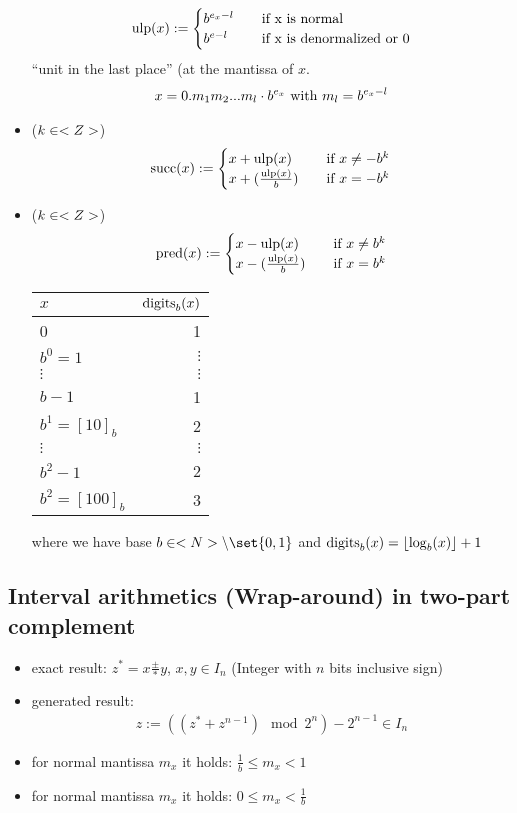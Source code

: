 \begin{itemize}
  \begin{align*}
    \operatorname{ulp}(x) := \begin{cases}
    	b^{e_x-l} &\quad\text{if x is normal}\\
    	b^{e-l} &\quad\text{if x is denormalized or }0
    \end{cases}
  \end{align*} 
 ``unit in the last place'' (at the mantissa of $x$. 
  \begin{align*}
  	x=0.m_1 m_2...m_l\cdot b^{e_x} \text{ with } m_l = b^{e_x - l}
  \end{align*}
  \item {} ($k \in <Z>$)
  \begin{align*}
  	\operatorname{succ}(x) := \begin{cases}
  		x+\operatorname{ulp}(x) &\quad \text{if } x\neq -b^k\\
  		x+(\frac{\operatorname{ulp}(x)}{b}) &\quad \text{if } x=-b^k
  	\end{cases}
  \end{align*}
  \item {} ($k\in <Z>$)
  \begin{align*}
  	\operatorname{pred}(x) := \begin{cases}
  		x-\operatorname{ulp}(x)& \quad\text{if } x\neq b^k\\
  		x-(\frac{\operatorname{ulp}(x)}{b})& \quad\text{if } x=b^k	
  	\end{cases}
  \end{align*}
  \begin{tabular}{l|r} %
  	\textbf{$x$}   & $\operatorname{digits}_b(x)$\\ \hline
  	0 & 1\\
  	$b^0 = 1$ & $\vdots$ \\
  	$\vdots$ & $\vdots$ \\
  	$b-1$ & 1\\
  	$b^1 = [10]_b$ & 2\\
  	$\vdots$ & $\vdots$\\
  	$b^2 -1$ & 2\\
  	$b^2 = [100]_b$ & 3\\
  \end{tabular}
	where we have base $b \in \N\setminus \set{0,1}$ and $\operatorname{digits}_b(x) = \lfloor \log_b(x)\rfloor +1$
\end{itemize}
\subsection*{Interval arithmetics (Wrap-around) in two-part complement}
	\begin{itemize}
		\item exact result: $z^* =x\frac{\pm}{\ast} y$, $x,y\in I_n$ (Integer with $n$ bits inclusive sign)
		\item generated result: 
		\begin{align*}
			z:=((z^*+z^{n-1})\mod2^n)-2^{n-1}\in I_n
		\end{align*}
		\item for normal mantissa $m_x$ it holds: $\frac{1}{b}\leqslant m_x<1$
		\item  for normal mantissa $m_x$ it holds: $0\leqslant m_x<\frac{1}{b}$
	\end{itemize}

